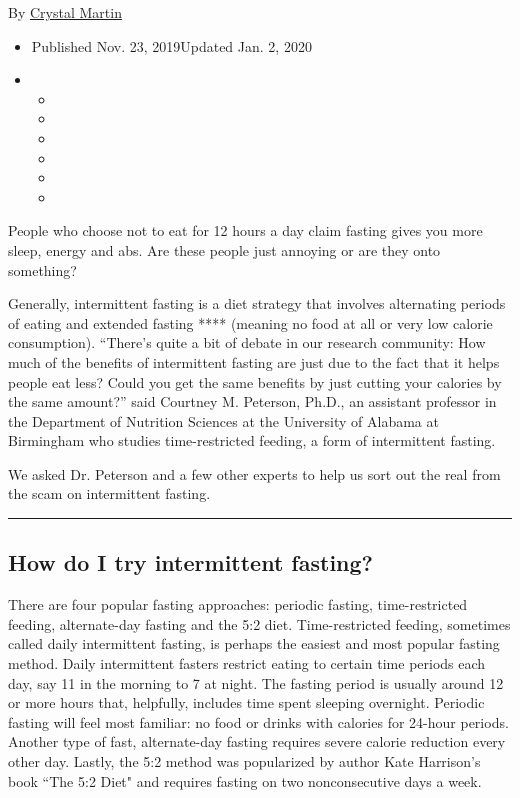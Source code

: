 By \href{https://www.nytimes.com/by/crystal-martin}{Crystal Martin}

\begin{itemize}
\item
  Published Nov. 23, 2019Updated Jan. 2, 2020
\item
  \begin{itemize}
  \item
  \item
  \item
  \item
  \item
  \item
  \end{itemize}
\end{itemize}

People who choose not to eat for 12 hours a day claim fasting gives you
more sleep, energy and abs. Are these people just annoying or are they
onto something?

Generally, intermittent fasting is a diet strategy that involves
alternating periods of eating and extended fasting **** (meaning no food
at all or very low calorie consumption). ``There's quite a bit of debate
in our research community: How much of the benefits of intermittent
fasting are just due to the fact that it helps people eat less? Could
you get the same benefits by just cutting your calories by the same
amount?'' said Courtney M. Peterson, Ph.D., an assistant professor in
the Department of Nutrition Sciences at the University of Alabama at
Birmingham who studies time-restricted feeding, a form of intermittent
fasting.

We asked Dr. Peterson and a few other experts to help us sort out the
real from the scam on intermittent fasting.

\begin{center}\rule{0.5\linewidth}{\linethickness}\end{center}

\hypertarget{how-do-i-try-intermittent-fasting}{%
\subsection{How do I try intermittent
fasting?}\label{how-do-i-try-intermittent-fasting}}

There are four popular fasting approaches: periodic fasting,
time-restricted feeding, alternate-day fasting and the 5:2 diet.
Time-restricted feeding, sometimes called daily intermittent fasting, is
perhaps the easiest and most popular fasting method. Daily intermittent
fasters restrict eating to certain time periods each day, say 11 in the
morning to 7 at night. The fasting period is usually around 12 or more
hours that, helpfully, includes time spent sleeping overnight. Periodic
fasting will feel most familiar: no food or drinks with calories for
24-hour periods. Another type of fast, alternate-day fasting requires
severe calorie reduction every other day. Lastly, the 5:2 method was
popularized by author Kate Harrison's book ``The 5:2 Diet" and requires
fasting on two nonconsecutive days a week.


